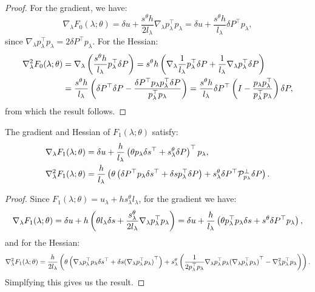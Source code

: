 \documentclass[eikonal.tex]{subfiles}
\begin{document}
\begin{proof}
  For the gradient, we have:
  \begin{equation*}
    \nabla_\lambda F_0(\lambda; \theta) = \delta u + \frac{s^{\theta} h}{2 l_\lambda} \nabla_\lambda p_\lambda^\top p_\lambda = \delta u + \frac{s^{\theta} h}{l_\lambda} \delta P^\top p_\lambda,
  \end{equation*}
  since
  $\nabla_\lambda p_\lambda^\top p_\lambda = 2 \delta P^\top
  p_\lambda$. For the Hessian:
  \begin{align*}
    \nabla^2_\lambda F_0(\lambda; \theta) &= \nabla_\lambda \left(\frac{s^{\theta} h}{l_\lambda} p_\lambda^\top \delta P\right) = s^{\theta} h \left(\nabla_\lambda \frac{1}{l_\lambda} p_\lambda^\top \delta P + \frac{1}{l_\lambda} \nabla_\lambda p_\lambda^\top \delta P\right) \\
    &= \frac{s^{\theta} h}{l_\lambda} \left(\delta P^\top \delta P - \frac{\delta P^\top p_\lambda p_\lambda^\top \delta P}{p_\lambda^\top p_\lambda}\right) = \frac{s^{\theta} h}{l_\lambda} \delta P^\top \left(I - \frac{p_\lambda p_\lambda^\top}{p_\lambda^\top p_\lambda}\right) \delta P,
  \end{align*}
  from which the result follows.
\end{proof}

\begin{lemma}\label{prop:F1-grad-and-Hess}
  The gradient and Hessian of $F_1(\lambda; \theta)$ satisfy:
  \begin{align}
    \nabla_\lambda F_1(\lambda; \theta) &= \delta u + \frac{h}{l_\lambda} \left(\theta p_\lambda \delta s^\top + s^{\theta}_\lambda \delta P\right)^\top p_\lambda, \\
    \nabla_\lambda^2 F_1(\lambda; \theta) &= \frac{h}{l_\lambda} \left(\theta \left(\delta P^\top p_\lambda \delta s^\top + \delta s p_\lambda^\top \delta P\right) + s^{\theta}_\lambda \delta P^\top \mathcal{P}^\perp_{p_\lambda} \delta P\right). \label{eq:hess-F1}
  \end{align}
\end{lemma}

\begin{proof}
  Since $F_1(\lambda; \theta) = u_\lambda + h s^{\theta}_\lambda l_\lambda$, for the gradient we have:
  \begin{equation*}
    \nabla_\lambda F_1(\lambda; \theta) = \delta u + h \left(\theta l_\lambda \delta s + \frac{s^{\theta}_\lambda}{2l_\lambda} \nabla_\lambda p_\lambda^\top p_\lambda\right) = \delta u + \frac{h}{l_\lambda} \left(\theta p_\lambda^\top p_\lambda \delta s + s^{\theta} \delta P^\top p_\lambda\right),
  \end{equation*}
  and for the Hessian:
  \begin{equation*}
    \nabla_\lambda^2 F_1(\lambda; \theta) = \frac{h}{2 l_\lambda} \left(\theta \left(\nabla_\lambda p_\lambda^\top p_\lambda \delta s^\top + \delta s {(\nabla_\lambda p_\lambda^\top p_\lambda)}^\top\right) + s^{\theta}_\lambda \left(\frac{1}{2 p_\lambda^\top p_\lambda} \nabla_\lambda p_\lambda^\top p_\lambda {(\nabla_\lambda p_\lambda^\top p_\lambda)}^\top - \nabla^2_\lambda p_\lambda^\top p_\lambda\right)\right).
  \end{equation*}
  Simplfying this gives us the result.
\end{proof}
\end{document}
